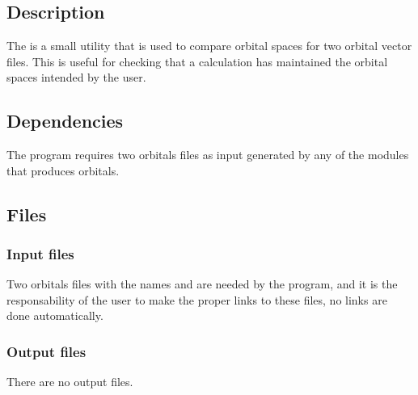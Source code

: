 \section{}
\label{UG:sec:cmocorr}
\subsection{Description}
\label{UG:sec:cmocorr_description}
The  is a small utility that is used to compare
orbital spaces for two orbital vector files. This is useful for checking
that a calculation has maintained the orbital spaces intended by the user.
\subsection{Dependencies}
\label{UG:sec:cmocorr_dependencies}
The  program requires two orbitals files as input
generated by any of the modules that produces orbitals.
\subsection{Files}
\label{UG:sec:cmocorr_files}
\subsubsection{Input files}
Two orbitals files with the names  and 
are needed by the program, and it is the responsability of the
user to make the proper links to these files, no links are
done automatically.
\subsubsection{Output files}
There are no output files.
